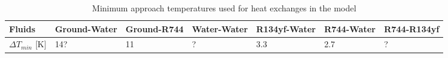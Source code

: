 \begin{table}[h!]
\centering
\caption{Minimum approach temperatures used for heat exchanges in the model}\vspace{2mm}
\label{tab:dtmins} 
\begin{tabular}{lllllll}
\toprule
Fluids             & Ground-Water & Ground-R744 & Water-Water & R134yf-Water & R744-Water & R744-R134yf \\
\midrule
$\Delta T_{min}$ [K] & 14?          & 11          & ?           & 3.3          & 2.7        & ? \\
\bottomrule
\end{tabular}
\end{table}
